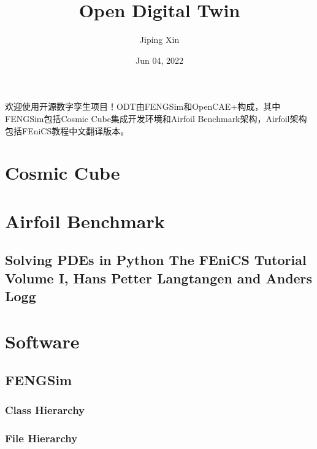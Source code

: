 \documentclass[letterpaper,10pt,english]{sphinxmanual}
\title{Open Digital Twin}
\date{Jun 04, 2022}
\author{Jiping Xin}
\begin{document}
\pagestyle{empty}
\sphinxmaketitle
\pagestyle{plain}
\sphinxtableofcontents
\pagestyle{normal}
\label{\detokenize{index::doc}}
\sphinxAtStartPar
欢迎使用开源数字孪生项目！ODT由FENGSim和OpenCAE+构成，其中FENGSim包括Cosmic Cube集成开发环境和Airfoil Benchmark架构，Airfoil架构包括FEniCS教程中文翻译版本。




\chapter{Cosmic Cube}
\label{\detokenize{index:cosmic-cube}}

\chapter{Airfoil Benchmark}
\label{\detokenize{index:airfoil-benchmark}}

\section{Solving PDEs in Python \textendash{} The FEniCS Tutorial Volume I, Hans Petter Langtangen and Anders Logg}
\label{\detokenize{index:solving-pdes-in-python-the-fenics-tutorial-volume-i-hans-petter-langtangen-and-anders-logg}}

\chapter{Software}
\label{\detokenize{index:software}}
\sphinxstepscope


\section{FENGSim}
\label{\detokenize{api/library_root:fengsim}}\label{\detokenize{api/library_root::doc}}

\subsection{Class Hierarchy}
\label{\detokenize{api/library_root:class-hierarchy}}



\subsection{File Hierarchy}
\label{\detokenize{api/library_root:file-hierarchy}}
\end{document}
